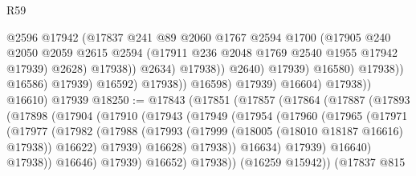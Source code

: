\begin{lexlean}{R59}
\begin{coremodule}
                                            @2596
                                            @17942
                                            (@17837
                                              @241
                                              @89
                                              @2060
                                              @1767
                                              @2594
                                              @1700
                                              (@17905
                                                @240
                                                @2050
                                                @2059
                                                @2615
                                                @2594
                                                (@17911 @236 @2048 @1769 @2540 @1955 @17942 @17939)
                                                @2628)
                                              @17938))
                                          @2634)
                                        @17938))
                                    @2640)
                                  @17939)
                                @16580)
                              @17938))
                          @16586)
                        @17939)
                      @16592)
                    @17938))
                @16598)
              @17939)
            @16604)
          @17938))
      @16610)
    @17939
@18250 := @17843
    (@17851
      (@17857
        (@17864
          (@17887
            (@17893
              (@17898
                (@17904
                  (@17910
                    (@17943
                      (@17949
                        (@17954
                          (@17960
                            (@17965
                              (@17971
                                (@17977
                                  (@17982
                                    (@17988
                                      (@17993
                                        (@17999 (@18005 (@18010 @18187 @16616) @17938))
                                        @16622)
                                      @17939)
                                    @16628)
                                  @17938))
                              @16634)
                            @17939)
                          @16640)
                        @17938))
                    @16646)
                  @17939)
                @16652)
              @17938))
          (@16259 @15942))
        (@17837
          @815

\end{coremodule}
\end{lexlean}
